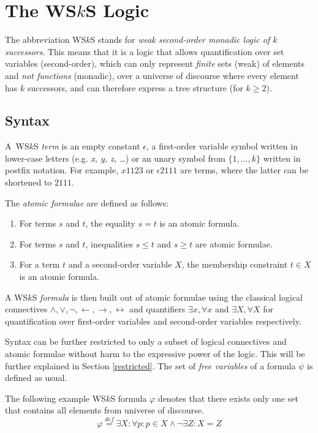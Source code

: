 \chapter{The WS$k$S Logic}\label{wsks}
The abbreviation WS$k$S stands for \emph{weak second-order monadic logic of $k$
successors}. This means that it is a logic that allows quantification over set
variables (second-order), which can only represent \emph{finite} sets (weak) of
elements and \emph{not functions} (monadic), over a universe of discourse where
every element has $k$ successors, and can therefore express a tree structure
(for $k \geq 2$).
 
 \section{Syntax}
 A~WS$k$S \emph{term} is an empty constant $\epsilon$, a first-order variable
 symbol written in lower-case letters (e.g. \emph{x, y, z, \ldots}) or an unary
 symbol from $\{1,\ldots,k\}$ written in postfix notation.
 For example, $x1123$ or $\epsilon2111$ are terms, where the latter can be
 shortened to $2111$.

The \emph{atomic formulae} are defined as follows:
 \begin{enumerate}
  \item For terms $s$ and $t$, the equality $s = t$ is an atomic formula.
\item For terms $s$ and $t$, inequalities $s \leq t$ and $s \geq t$ are atomic
formulae.
\item For a term $t$ and a second-order variable $X$, the membership constraint
$t \in X$ is an atomic formula.
 \end{enumerate}

A WS$k$S \emph{formula} is then built out of atomic formulae using the
classical logical connectives $\wedge, \vee, \neg, \leftarrow, \rightarrow,
\leftrightarrow$ and quantifiers $\exists x, \forall x$ and $\exists X, \forall
X$ for quantification over first-order variables and second-order variables
respectively.

Syntax can be further restricted to only a subset of logical connectives and
atomic formulae without harm to the expressive power of the logic. This will be
further explained in Section \ref{restricted}. The set of \emph{free variables}
of a formula $\psi$ is defined as usual.
  
  \noindent\hrulefill
  \begin{example}
  The following example WS$k$S formula $\varphi$ denotes that there exists only
  one set that contains all elements from universe of discourse.
  \begin{equation}
   \varphi \overset{\mathit{def}}{=} \exists X: \forall p: p \in X \wedge
   \neg\exists Z:
   X = Z
  \end{equation}
   \hrulefill
  \end{example}\label{wsks-formula}
  
